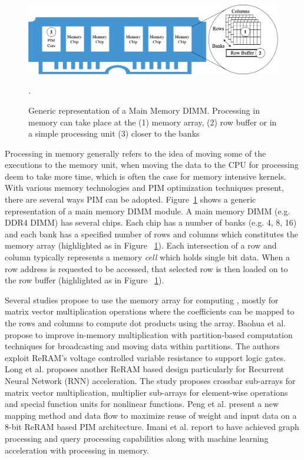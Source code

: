 \begin{figure}[hbt!]
\centering
\includegraphics[width=.8\linewidth]{MEMSYS22/figures/pimcat.png}
\caption{Generic representation of a Main Memory DIMM. Processing in memory can take place at the (1) memory array, (2) row buffer or in a simple processing unit (3) closer to the banks}.
\label{fig:pimcat}
\end{figure}   




Processing in memory generally refers to the idea of moving some of the executions to the memory unit, when moving the data to the CPU for processing deem to take more time, which is often the case for memory intensive kernels. With various memory technologies and PIM optimization techniques present, there are several ways PIM can be adopted. Figure~\ref{fig:pimcat} shows a generic representation of a main memory DIMM module. A main memory DIMM (e.g. DDR4 DIMM) has several chips. Each chip has a number of banks (e.g. 4, 8, 16) and each bank has a specified number of rows and columns which constitutes the memory array (highlighted as  in Figure ~\ref{fig:pimcat}). Each intersection of a row and column typically represents a memory \textit{cell} which holds single bit data. When a row address is requested to be accessed, that selected row is then loaded on to the row buffer (highlighted as  in Figure ~\ref{fig:pimcat}). 

Several studies propose to use the memory array  for computing \cite{03,06,13,15,20,29}, mostly for matrix vector multiplication operations where the coefficients can be mapped to the rows and columns to compute dot products using the array. Baohua et al. \cite{13} propose to improve in-memory multiplication with partition-based computation techniques for broadcasting and moving data within partitions. The authors exploit ReRAM's voltage controlled variable resistance to support logic gates. Long et al. \cite{20} proposes another ReRAM based design particularly for Recurrent Neural Network (RNN) acceleration. The study proposes crossbar sub-arrays for matrix vector multiplication, multiplier sub-arrays for element-wise operations and special function units for nonlinear functions. Peng et al. \cite{15} present a new mapping method and data flow to maximize reuse of weight and input data on a 8-bit ReRAM based PIM architecture. Imani et al. \cite{6} report to have achieved graph processing and query processing capabilities along with machine learning acceleration with processing in memory.  


